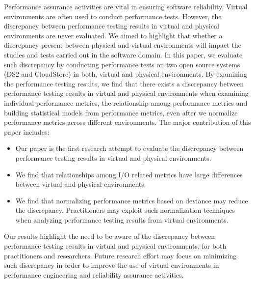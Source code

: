 Performance assurance activities are vital in ensuring software reliability. Virtual environments are often used to conduct performance tests. However, the discrepancy between performance testing results in virtual and physical environments are never evaluated. We aimed to highlight that whether a discrepancy present between physical and virtual environments will impact the studies and tests carried out in the software domain. In this paper, we evaluate such discrepancy by conducting performance tests on two open source systems (DS2 and CloudStore) in both, virtual and physical environments. By examining the performance testing results, we find that there exists a discrepancy between performance testing results in virtual and physical environments when examining individual performance metrics, the relationship among performance metrics and building statistical models from performance metrics, even after we normalize performance metrics across different environments. The major contribution of this paper includes: 
\begin{itemize} \itemsep -0.4pt 
	\item Our paper is the first research attempt to evaluate the discrepancy between performance testing results in virtual and physical environments.
	\item We find that relationships among I/O related metrics have large differences between virtual and physical environments.
	\item We find that normalizing performance metrics based on deviance may reduce the discrepancy. Practitioners may exploit such normalization techniques when analyzing performance testing results from virtual environments.
\end{itemize}
Our results highlight the need to be aware of the discrepancy between performance testing results in virtual and physical environments, for both practitioners and researchers. Future research effort may focus on minimizing such discrepancy in order to improve the use of virtual environments in performance engineering and reliability assurance activities.



